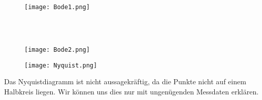 \newpage


\begin{figure}[h]
\centering
\texttt{[image: Bode1.png]}
\end{figure}

\hfill \\
\hfill \\


\begin{figure}[h]
\centering
\texttt{[image: Bode2.png]}
\end{figure}


\newpage

\begin{figure}[h]
\centering
\texttt{[image: Nyquist.png]}
\end{figure}


Das Nyquistdiagramm ist nicht aussagekräftig, da die Punkte nicht auf einem Halbkreis liegen. Wir können uns dies nur mit ungenügenden Messdaten erklären.



